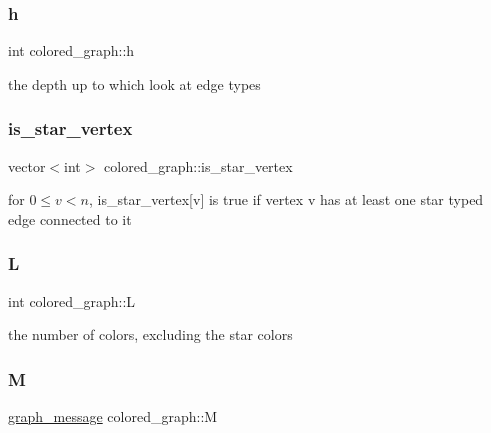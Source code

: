 \mbox{\label{classcolored__graph_ae27062a4ee59df2670d3a0c81e85a3fa}} 
\subsubsection{\texorpdfstring{h}{h}}
{\footnotesize\ttfamily int colored\+\_\+graph\+::h}



the depth up to which look at edge types 

\mbox{\label{classcolored__graph_a00d0c64fcf8de58553aa4cade64193df}} 
\subsubsection{\texorpdfstring{is\+\_\+star\+\_\+vertex}{is\_star\_vertex}}
{\footnotesize\ttfamily vector$<$int$>$ colored\+\_\+graph\+::is\+\_\+star\+\_\+vertex}



for $0 \leq v < n$, is\+\_\+star\+\_\+vertex\mbox{[}v\mbox{]} is true if vertex v has at least one star typed edge connected to it 

\mbox{\label{classcolored__graph_ae159d1b15106b70a2eabef8884501e97}} 
\subsubsection{\texorpdfstring{L}{L}}
{\footnotesize\ttfamily int colored\+\_\+graph\+::L}



the number of colors, excluding the star colors 

\mbox{\label{classcolored__graph_ab72c568fe12f7c849ca6bffb145aec47}} 
\subsubsection{\texorpdfstring{M}{M}}
{\footnotesize\ttfamily \hyperlink{classgraph__message}{graph\+\_\+message} colored\+\_\+graph\+::M}



